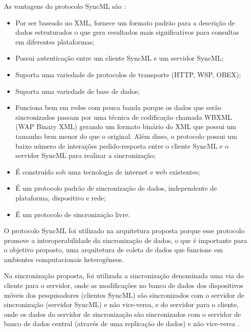 As vantagens do protocolo SyncML são \cite{ericsson} \cite{ericsson2} :

\begin{itemize}
\item Por ser baseado no XML, fornece um formato padrão para a descrição de dados estruturados o que gera resultados mais significativos para consultas em diferentes plataformas;
\item Possui autenticação entre um cliente SyncML e um servidor SyncML;
\item Suporta uma variedade de protocolos de transporte (HTTP, WSP, OBEX);
\item Suporta uma variedade de base de dados;
\item Funciona bem em redes com pouca banda porque os dados que serão sincronizados passam por uma técnica de codificação chamada WBXML (WAP Binary XML) gerando um formato binário do XML que possui um tamanho bem menor do que o original. Além disso, o protocolo possui um baixo número de interações pedido-resposta entre o cliente SyncML e o servidor SyncML para realizar a sincronização; 
\item É construído sob uma tecnologia de internet e web existentes;
\item É um protocolo padrão de sincronização de dados, independente de plataforma, dispositivo e rede;
\item É um protocolo de sincronização livre.
\end{itemize}

O protocolo SyncML foi utilizado na arquitetura proposta porque esse protocolo promove a interoperabilidade da sincronização de dados, o que é importante para o objetivo proposto, uma arquitetura de coleta de dados que funcione em ambientes computacionais heterogêneos.

Na sincronização proposta, foi utilizada a sincronização denominada uma via do cliente para o servidor, onde as modificações no banco de dados dos dispositivos móveis dos pesquisadores (clientes SyncML) são sincronizados com o servidor de sincronização (servidor SyncML) e não vice-versa, e do servidor para o cliente, onde os dados do servidor de sincronização são sincronizados com o servidor de banco de dados central (através de uma replicação de dados) e não vice-versa \cite{ericsson} \cite{ericsson2}.